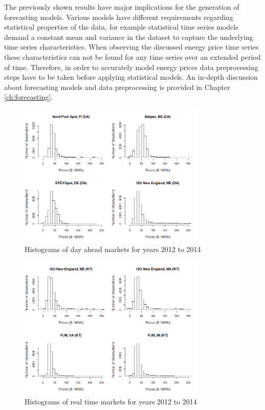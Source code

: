 The previously shown results have major implications for the generation of forecasting models. Various models have different requirements regarding statistical properties of the data, for example statistical time series models demand a constant mean and variance in the dataset to capture the underlying time series characteristics. When observing the discussed energy price time series these characteristics can not be found for any time series over an extended period of time. Therefore, in order to accurately model energy prices data preprocessing steps have to be taken before applying statistical models. An in-depth discussion about forecasting models and data preprocessing is provided in Chapter \ref{ch:forecasting}. 



\begin{figure}[htbp]
	\centering
		\includegraphics[width=0.8\textwidth]{figures/data_analysis/Histograms_da_2012_2014.png}
	\caption{Histograms of day ahead markets for years 2012 to 2014}
	\label{fig:Histograms_da_2012_2014}
\end{figure}

\begin{figure}[htbp]
	\centering
		\includegraphics[width=0.8\textwidth]{figures/data_analysis/Histograms_rt_2012_2014.png}
	\caption{Histograms of real time markets for years 2012 to 2014}
	\label{fig:Histograms_rt_2012_2014}
\end{figure}




